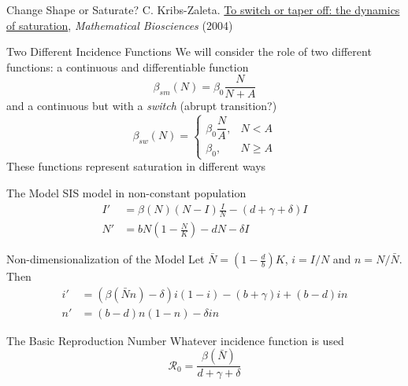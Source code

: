 \documentclass[aspectratio=169]{beamer}\usepackage[]{graphicx}\usepackage[]{xcolor}
\begin{document}
\begin{frame}{Change Shape or Saturate?}
\bbullet C. Kribs-Zaleta. \href{https://doi.org/10.1016/j.mbs.2004.11.001}{To switch or taper off: the dynamics of saturation}, \emph{Mathematical Biosciences} (2004)
\end{frame}

\begin{frame}{Two Different Incidence Functions}
\bbullet We will consider the role of two different functions: a continuous and differentiable function
\begin{equation}
\beta_{sm}(N)=\beta_0\frac{N}{N+A}
\tag{10}\label{eq:CK_1}
\end{equation}
and a continuous but with a \emph{switch} (abrupt transition?)
\begin{equation}
\beta_{sw}(N)=
\begin{cases}
\beta_0\dfrac{N}{A},& N<A \\
\beta_0,& N\geq A
\end{cases}
\tag{11}\label{eq:CK_2}
\end{equation}
\bbullet These functions represent saturation in different ways
\end{frame}

\begin{frame}{The Model}
\bbullet SIS model in non-constant population
\begin{align}
I' &= \beta(N)(N-I)\frac{I}{N}-(d+\gamma+\delta)I \\
N' &= bN\left(1-\frac{N}{K}\right)-dN-\delta I
\end{align}
\end{frame}

\begin{frame}{Non-dimensionalization of the Model}
\bbullet Let $\bar{N}=(1-\frac{d}{b})K$, $i=I/N$ and $n=N/\bar{N}.$ Then
\begin{align}
i' &= (\beta(\bar{N} n)-\delta)i(1-i)-(b+\gamma)i+(b-d)in \tag{12a}\\
n' &= (b-d)n(1-n)-\delta in\tag{12b}
\end{align}
\end{frame}

\begin{frame}{The Basic Reproduction Number}
\bbullet Whatever incidence function is used
\[
\mathcal{R}_0
=\frac{\beta(\bar{N})}{d+\gamma+\delta}
\]
\end{frame}
\end{document}

